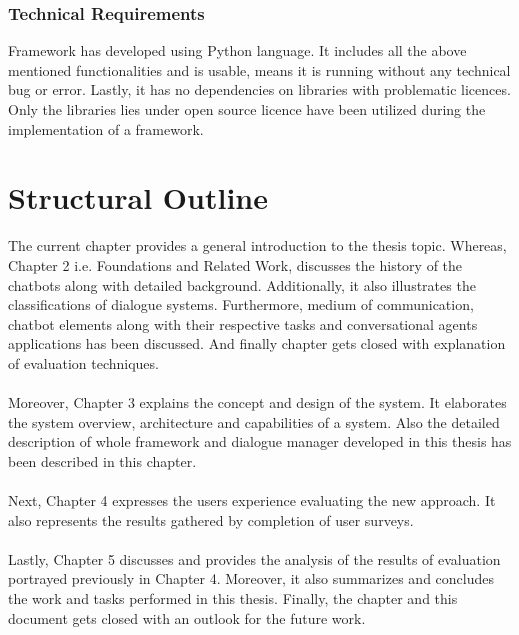 \subsubsection*{Technical Requirements}
Framework has developed using Python language. It includes all the above mentioned functionalities and is usable, means it is running without any technical bug or error. Lastly, it has no dependencies on libraries with problematic licences. Only the libraries lies under open source licence have been utilized during the implementation of a framework.

\section{Structural Outline}
The current chapter provides a general introduction to the thesis topic. Whereas, Chapter 2 i.e. Foundations and Related Work, discusses the history of the chatbots along with detailed background. Additionally, it also illustrates the classifications of dialogue systems. Furthermore, medium of communication, chatbot elements along with their respective tasks and conversational agents applications has been discussed. And finally chapter gets closed with explanation of evaluation techniques. 
\\~\\
Moreover, Chapter 3 explains the concept and design of the system. It elaborates the system overview, architecture and capabilities of a system. Also the detailed description of whole framework and dialogue manager developed in this thesis has been described in this chapter.
\\~\\
Next, Chapter 4 expresses the users experience evaluating the new approach. It also represents the results gathered by completion of user surveys.
\\~\\
Lastly, Chapter 5 discusses and provides the analysis of the results of evaluation portrayed previously in Chapter 4. Moreover, it also summarizes and concludes the work and tasks performed in this thesis. Finally, the chapter and this document gets closed with an outlook for the future work.

